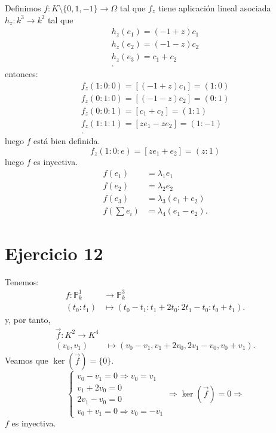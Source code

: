 \documentclass[10pt,a4paper,openright]{book}
\theoremstyle{break}
\begin{document}
\begin{itemize}
Definimos $f: K\setminus \{0, 1, -1\} \rightarrow \Omega$ tal que $f_z$ tiene aplicación lineal asociada $h_z: k^3 \rightarrow k^2$ tal que
\begin{align*}
    h_z\left( e_1 \right) = \left( -1 + z \right) c_1\\
    h_z\left( e_2 \right) = \left( -1 - z \right) c_2\\
    h_z\left( e_3 \right) = c_1 + c_2\\
.\end{align*}
entonces: 
\begin{align*}
    f_z\left( 1 : 0 : 0 \right) = \left[ \left( -1 + z \right) c_1 \right] = \left( 1 : 0 \right)\\
    f_z\left( 0 : 1 : 0 \right) = \left[ \left( -1 - z \right) c_2 \right] = \left( 0 : 1 \right)\\
    f_z\left( 0 : 0 : 1 \right) = \left[ c_1 + c_2\right] = \left( 1 : 1 \right)\\
    f_z\left( 1 : 1 : 1 \right) = \left[ ze_1 - ze_2 \right] = \left( 1 : -1 \right)\\
.\end{align*}
luego $f$ está bien definida.
\[
f_z\left( 1 : 0 : e \right) = \left[ ze_1 + e_2 \right] = \left( z : 1 \right) 
\]
luego $f$ es inyectiva.
\begin{align*}
    f\left( e_1 \right) &= \lambda_1 e_1\\
    f\left( e_2 \right) &= \lambda_2 e_2\\
    f\left( e_3 \right) &= \lambda_3 \left( e_1 + e_2 \right) \\
    f\left( \sum e_i  \right) &= \lambda_4 \left( e_1 - e_2 \right)
.\end{align*}
\end{itemize}

\section{Ejercicio 12}%
\label{sec:ejercicio_12_2}
Tenemos: 
\begin{align*}
    f: \mathbb{P}^{1}_{k} &\rightarrow \mathbb{P}^{3}_{k} \\
    \left( t_0 : t_1 \right) &\mapsto \left( t_0 - t_1 : t_1 + 2t_0 : 2t_1 - t_0 : t_0 + t_1 \right) 
.\end{align*}
y, por tanto, 
\begin{align*}
    \overrightarrow{f}: K^2 \rightarrow K^4\\
    \left( v_0, v_1 \right) &\mapsto \left( v_0 - v_1, v_1 + 2v_0, 2v_1 - v_0, v_0 + v_1 \right)  
.\end{align*}
Veamos que $\ker\left( \overrightarrow{f} \right) = \{0\}$.
\[
\begin{cases}
    v_0 - v_1 = 0 \Rightarrow v_0 = v_1\\
    v_1 + 2v_0 = 0\\
    2v_1 - v_0 = 0\\
    v_0 + v_1 = 0 \Rightarrow v_0 = -v_1
\end{cases} \Rightarrow
\ker \left( \overrightarrow{f} \right) = 0 \Rightarrow 
\]
$f$ es inyectiva.
\end{document}

